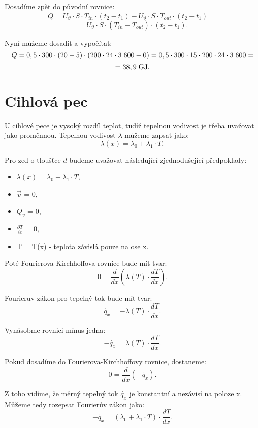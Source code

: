 \documentclass{article}
\begin{document}
Dosadíme zpět do původní rovnice:
$$
    Q = U_\vartheta \cdot S \cdot T_{in} \cdot (t_2 - t_1) - U_\vartheta \cdot S \cdot \overline{T}_{out} \cdot (t_2 - t_1) =
$$
$$
    = U_\vartheta \cdot S \cdot (T_{in} - \overline{T}_{out}) \cdot (t_2 - t_1).
$$

Nyní můžeme dosadit a vypočítat:
$$
    Q = 0,5 \cdot 300 \cdot (20 - 5) \cdot (200 \cdot 24 \cdot 3 \; 600 - 0) = 0,5 \cdot 300 \cdot 15 \cdot 200 \cdot 24 \cdot 3 \; 600 =
$$
$$
    = 38,9 \; \textrm{GJ}.
$$


\newpage



\section{ Cihlová pec \spicy \spicy \spicy \spicy}
U cihlové pece je vysoký rozdíl teplot, tudíž tepelnou vodivost je třeba uvažovat jako proměnnou. Tepelnou vodivost $\lambda$ můžeme zapsat jako:
$$
    \lambda (x) = \lambda_0 + \lambda_1 \cdot T,
$$

Pro zeď o tloušťce $d$ budeme uvažovat následující zjednodušející předpoklady:
\begin{itemize}
    \item $\lambda (x) = \lambda_0 + \lambda_1 \cdot T$,
    \item $\vec{v}$ = 0,
    \item $Q_v$ = 0,
    \item $\frac{\partial T}{\partial t}$ = 0,
    \item T = T(x) - teplota závislá pouze na ose x.
\end{itemize}

Poté Fourierova-Kirchhoffova rovnice bude mít tvar:
$$
    0 = \frac{d}{dx} \left ( \lambda (T) \cdot \frac{dT}{dx} \right ).
$$

Fourieruv zákon pro tepelný tok bude mít tvar:
$$
    \dot{q_x} = - \lambda (T) \cdot \frac{dT}{dx}.
$$

Vynásobme rovnici mínus jedna:
$$
    - \dot{q_x} = \lambda (T) \cdot \frac{dT}{dx}.
$$

Pokud dosadíme do Fourierova-Kirchhoffovy rovnice, dostaneme:
$$
    0 = \frac{d}{dx} \left ( - \dot{q_x} \right ).
$$

Z toho vidíme, že měrný tepelný tok $\dot{q_x}$ je konstantní a nezávisí na poloze x. Můžeme tedy rozepsat Fourierův zákon jako:
$$
    - \dot{q_x} = \left( \lambda_0 + \lambda_1 \cdot T \right) \cdot \frac{dT}{dx}.
$$
\end{document}
